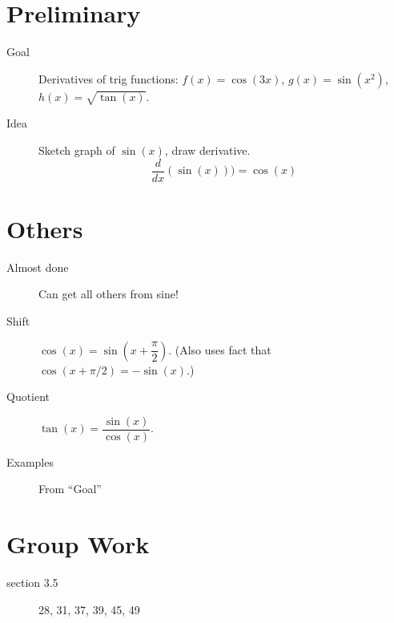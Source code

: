 \documentclass[11pt]{article}
\begin{document}
\drawtitle

\section*{Preliminary}
\begin{description}
\item[Goal] Derivatives of trig functions: $f(x)=\cos(3x)$,
  $g(x)=\sin(x^2)$, $h(x)=\sqrt{\tan(x)}$.
\item[Idea] Sketch graph of $\sin(x)$, draw derivative.
  \[
  \dfrac{d}{dx}(\sin(x)))=\cos(x)
  \]
\end{description}

\section*{Others}
\begin{description}
\item[Almost done] Can get all others from sine!
\item[Shift] $\cos(x)=\sin\left(x+\dfrac{\pi}{2}\right)$.  (Also uses
  fact that $\cos(x+\pi/2)=-\sin(x)$.)
\item[Quotient] $\tan(x)=\dfrac{\sin(x)}{\cos(x)}$.
\item[Examples] From ``Goal''
\end{description}

\section*{Group Work}
\begin{description}
\item[section 3.5] 28, 31, 37, 39, 45, 49
\end{description}
\end{document}
